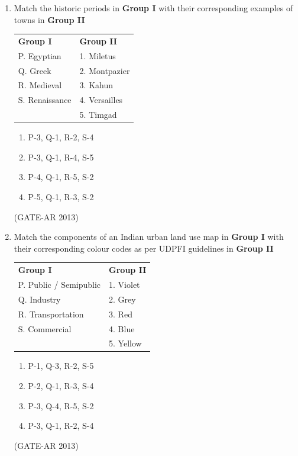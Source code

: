 \documentclass[a4paper,10pt]{article}
\begin{document}
\begin{enumerate}
    \item Match the historic periods in \textbf{Group I} with their corresponding examples of towns in \textbf{Group II} \\
    \begin{tabular}{ l l }
	\textbf{Group I} & \textbf{Group II} \\
	P. Egyptian & 1. Miletus \\
	Q. Greek & 2. Montpazier \\
	R. Medieval & 3. Kahun \\
	S. Renaissance & 4. Versailles \\
	& 5. Timgad \\
	\end{tabular}
	\begin{multicols}{2}
	\begin{enumerate}
        \item P-3, Q-1, R-2, S-4
        \item P-3, Q-1, R-4, S-5
        \item P-4, Q-1, R-5, S-2
        \item P-5, Q-1, R-3, S-2
    \end{enumerate}
	\end{multicols}
    \hfill (GATE-AR 2013)

    \item Match the components of an Indian urban land use map in \textbf{Group I} with their corresponding colour codes as per UDPFI guidelines in \textbf{Group II} \\
    \begin{tabular}{ l l }
	\textbf{Group I} & \textbf{Group II} \\
	P. Public / Semipublic & 1. Violet \\
	Q. Industry & 2. Grey \\
	R. Transportation & 3. Red \\
	S. Commercial & 4. Blue \\
	& 5. Yellow \\
	\end{tabular}
	\begin{multicols}{2}
	\begin{enumerate}
        \item P-1, Q-3, R-2, S-5
        \item P-2, Q-1, R-3, S-4
        \item P-3, Q-4, R-5, S-2
        \item P-3, Q-1, R-2, S-4
    \end{enumerate}
	\end{multicols}
    \hfill (GATE-AR 2013)


\end{enumerate}
\end{document}
